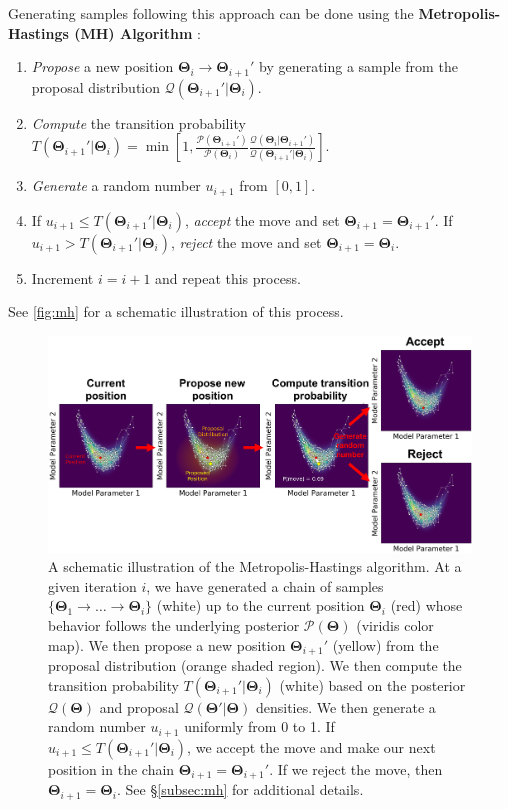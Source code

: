 \documentclass[12pt, titlepage]{article}
\newcommand{\params}{\ensuremath{\boldsymbol\Theta}}
\newcommand{\posterior}{\ensuremath{\mathcal{P}}}
\newcommand{\proposal}{\ensuremath{\mathcal{Q}}}
\begin{document}
Generating samples following this approach can be done using the
\textbf{Metropolis-Hastings (MH) Algorithm} \citep{metropolis+53_alt,hastings70}:
\begin{enumerate}
    \item \textit{Propose} a new position $\params_i \rightarrow \params_{i+1}'$
    by generating a sample from the proposal distribution
    $\proposal(\params_{i+1}'|\params_i)$.
    \item \textit{Compute} the transition probability
    $T(\params_{i+1}'|\params_i)
    = \min\left[1, \frac{\posterior(\params_{i+1}')}{\posterior(\params_i)}
    \frac{\proposal(\params_i|\params_{i+1}')}{\proposal(\params_{i+1}'|\params_i)}
    \right]$.
    \item \textit{Generate} a random number $u_{i+1}$ from $[0, 1]$.
    \item If $u_{i+1} \leq T(\params_{i+1}'|\params_i)$, \textit{accept}
    the move and set $\params_{i+1} = \params_{i+1}'$. 
    If $u_{i+1} > T(\params_{i+1}'|\params_i)$, \textit{reject} the move
    and set $\params_{i+1} = \params_i$.
    \item Increment $i = i + 1$ and repeat this process.
\end{enumerate}
See {\color{red} \autoref{fig:mh}} for a schematic illustration of this process.

\begin{figure}
\begin{center}
\includegraphics[width=\textwidth]{figures/fig10.png}
\end{center}
\caption{A schematic illustration of the Metropolis-Hastings
algorithm. At a given iteration $i$, we have generated a chain
of samples $\{ \params_1 \rightarrow \dots \rightarrow \params_i \}$
(white) up to the current position $\params_i$ (red) whose behavior follows
the underlying posterior $\posterior(\params)$ (viridis color map).
We then propose a new position $\params_{i+1}'$ (yellow) from the proposal distribution
(orange shaded region). We then compute 
the transition probability $T(\params_{i+1}'|\params_i)$
(white) based on the posterior $\proposal(\params)$ 
and proposal $\proposal(\params'|\params)$ densities. We then
generate a random number $u_{i+1}$ uniformly from 0 to 1. If
$u_{i+1} \leq T(\params_{i+1}'|\params_i)$, we accept the move
and make our next position in the chain $\params_{i+1} = \params_{i+1}'$.
If we reject the move, then $\params_{i+1} = \params_{i}$.
See \S\ref{subsec:mh} for additional details.
}\label{fig:mh}
\end{figure}
\end{document}
